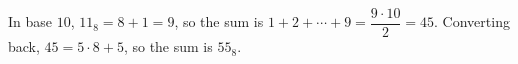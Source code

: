 In base $10$, $11_8=8+1=9$, so the sum is $1+2+\cdots+9=\dfrac{9\cdot10}{2}=45$. Converting back, $45=5\cdot8+5$, so the sum is $\boxed{55_8}$.

